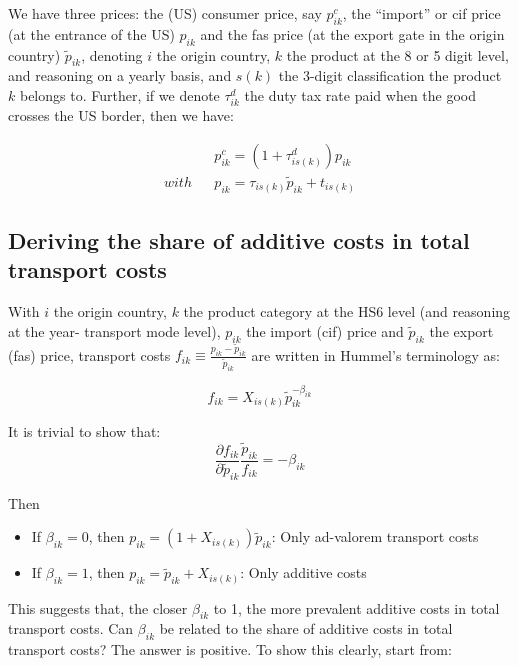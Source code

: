 \documentclass[a4paper,12pt]{article}
\begin{document}
We have three prices: the (US) consumer price, say $p^{c}_{ik}$, the ``import'' or  cif price (at the entrance of the US) $p_{ik}$ and the fas price (at the export gate in the origin country) $\widetilde{p}_{ik}$, denoting $i$ the origin country, $k$ the product at the 8 or 5 digit level, and reasoning on a yearly basis, and $s(k)$ the 3-digit classification the product $k$ belongs to. Further, if we denote $\tau^d_{ik}$ the duty tax rate paid when the good crosses the US border, then we have:

\begin{eqnarray*}
&&p^c_{ik} = (1+\tau^d_{is(k)})p_{ik} \\
with && p_{ik}  = \tau_{is(k)} \widetilde{p}_{ik} +t_{is(k)}
\end{eqnarray*}


\subsection{Deriving the share of additive costs in total transport costs \label{app:interpret_beta}}


With $i$ the origin country, $k$ the product category at the HS6 level (and reasoning at the year- transport mode level), $p_{ik}$ the import (cif) price and $\tilde{p}_{ik}$ the export (fas) price, transport costs $f_{ik}\equiv \frac{p_{ik}- \tilde{p}_{ik}}{\tilde{p}_{ik}} $ are written in Hummel's terminology as:


\begin{equation}
f_{ik} = X_{is(k)}\tilde{p}_{ik}^{-\beta_{ik}} \label{eq:Hummels}
\end{equation}

It is trivial to show that:
$$\frac{\partial f_{ik}}{\partial \tilde{p}_{ik}} \frac{\tilde{p}_{ik}}{f_{ik}}= -\beta_{ik}$$

Then
\begin{itemize}
\item If $\beta_{ik} = 0$, then $p_{ik} = (1+X_{is(k)})\tilde{p}_{ik}$: Only ad-valorem transport costs
\item If $\beta_{ik} = 1$, then $p_{ik}=\tilde{p}_{ik}+X_{is(k)}$: Only additive costs
\end{itemize}

This suggests that, the closer $\beta_{ik}$ to 1, the more prevalent additive costs in total transport costs. Can $\beta_{ik}$ be related to the share of additive costs in total transport costs? The answer is positive. To show this clearly, start from:
\end{document}
